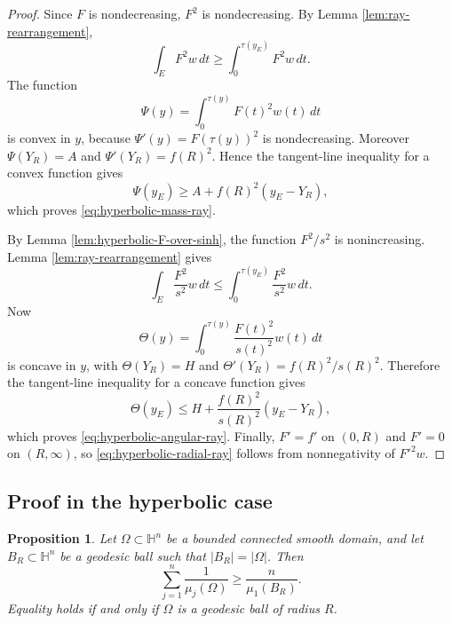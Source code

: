 \documentclass[10pt,a4paper]{amsart}
\newtheorem{proposition}[theorem]{Proposition}
\newcommand{\HH}{\mathbb H}
\begin{document}
\begin{proof}
Since $F$ is nondecreasing, $F^2$ is nondecreasing.  By Lemma \ref{lem:ray-rearrangement},
$$
        \int_EF^2w\,dt\ge \int_0^{\tau(y_E)}F^2w\,dt.
$$
The function
$$
        \Psi(y)=\int_0^{\tau(y)}F(t)^2w(t)\,dt
$$
is convex in $y$, because $\Psi'(y)=F(\tau(y))^2$ is nondecreasing.  Moreover $\Psi(Y_R)=A$ and $\Psi'(Y_R)=f(R)^2$.  Hence the tangent-line inequality for a convex function gives
$$
        \Psi(y_E)\ge A+f(R)^2(y_E-Y_R),
$$
which proves \eqref{eq:hyperbolic-mass-ray}.

By Lemma \ref{lem:hyperbolic-F-over-sinh}, the function $F^2/s^2$ is nonincreasing.  Lemma \ref{lem:ray-rearrangement} gives
$$
        \int_E\frac{F^2}{s^2}w\,dt
        \le \int_0^{\tau(y_E)}\frac{F^2}{s^2}w\,dt.
$$
Now
$$
        \Theta(y)=\int_0^{\tau(y)}\frac{F(t)^2}{s(t)^2}w(t)\,dt
$$
is concave in $y$, with $\Theta(Y_R)=H$ and $\Theta'(Y_R)=f(R)^2/s(R)^2$.  Therefore the tangent-line inequality for a concave function gives
$$
        \Theta(y_E)\le H+\frac{f(R)^2}{s(R)^2}(y_E-Y_R),
$$
which proves \eqref{eq:hyperbolic-angular-ray}.  Finally, $F'=f'$ on $(0,R)$ and $F'=0$ on $(R,\infty)$, so \eqref{eq:hyperbolic-radial-ray} follows from nonnegativity of $F'^2w$.
\end{proof}

\subsection{Proof in the hyperbolic case}

\begin{proposition}\label{prop:hyperbolic}
Let $\Omega\subset\HH^n$ be a bounded connected smooth domain, and let $B_R\subset\HH^n$ be a geodesic ball such that $|B_R|=|\Omega|$.  Then
\begin{equation}\label{eq:hyperbolic-conclusion}
        \sum_{j=1}^n\frac1{\mu_j(\Omega)}
        \ge
        \frac{n}{\mu_1(B_R)}.
\end{equation}
Equality holds if and only if $\Omega$ is a geodesic ball of radius $R$.
\end{proposition}
\end{document}
